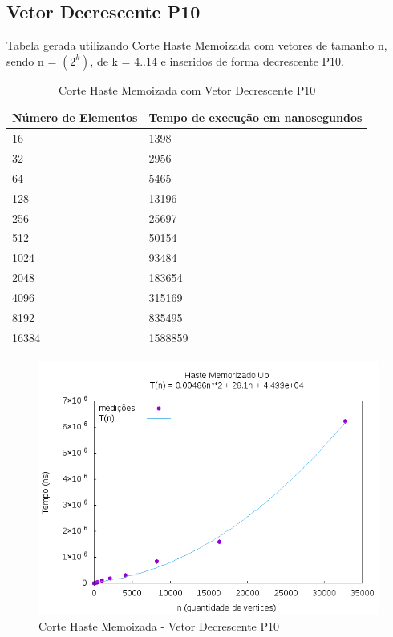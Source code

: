 \documentclass[12pt,a4paper,twoside]{report}
\begin{document}
\subsection{Vetor Decrescente P10}
Tabela gerada utilizando Corte Haste Memoizada com vetores de tamanho n, sendo n = $(2^k)$, de k = 4..14 e inseridos de forma decrescente P10.
\begin{table}[H]
\centering
\caption{Corte Haste Memoizada com Vetor Decrescente P10}
\label{my-label}
\begin{tabular}{|l|l|}
\hline
\multicolumn{1}{|c|}{\textbf{Número de Elementos}} & \multicolumn{1}{c|}{\textbf{Tempo de execução em nanosegundos}} \\ \hline
16 & 1398 \\ \hline
32 & 2956 \\ \hline
64 & 5465 \\ \hline
128 & 13196 \\ \hline
256 & 25697 \\ \hline
512 & 50154 \\ \hline
1024 & 93484 \\ \hline
2048 & 183654 \\ \hline
4096 & 315169 \\ \hline
8192 & 835495 \\ \hline
16384 & 1588859 \\ \hline

\end{tabular}
\end{table}

\begin{figure}[H]
    \centering
    \includegraphics[width=0.7\linewidth]{graficos/CorteHasteMemorizado/Decrescente P10/HasteMemo.png}
  \caption{Corte Haste Memoizada - Vetor Decrescente P10}
\end{figure}
\end{document}
